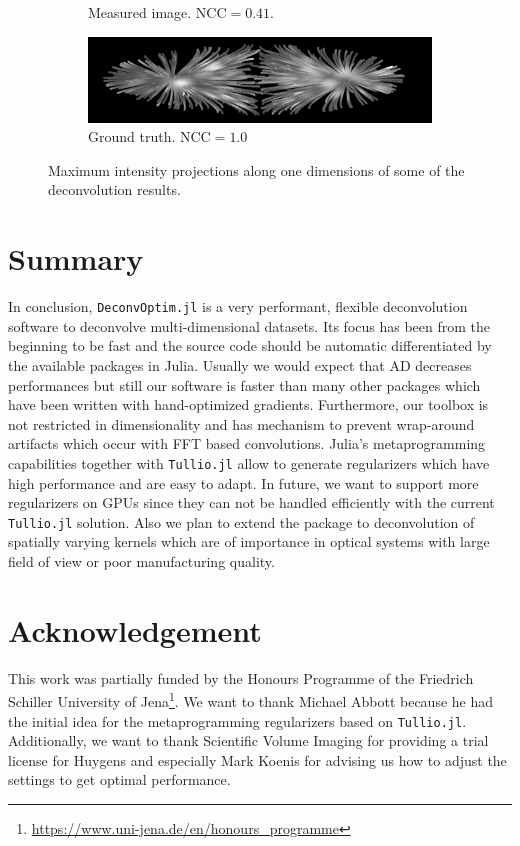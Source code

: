 \documentclass{juliacon}
\begin{document}
\begin{figure}[h]
\begin{subfigure}{.3\textwidth}
                \caption{Measured image. $\text{NCC}= 0.41$.}
            \end{subfigure}
            \begin{subfigure}{.3\textwidth}
                \centering
                \includegraphics[width=\textwidth]{figures/MIPs/mip_ground_truth.png}
                \caption{Ground truth. $\text{NCC}= 1.0$}
            \end{subfigure}
            \caption{Maximum intensity projections along one dimensions of some of the deconvolution results.}
            \label{img:results}
        \end{figure} 

\section{Summary}
    In conclusion, \verb|DeconvOptim.jl| is a very performant, flexible deconvolution software to deconvolve multi-dimensional datasets.
    Its focus has been from the beginning to be fast and the source code should be automatic differentiated by the available
    packages in Julia. Usually we would expect that AD decreases performances but still our software is faster than
    many other packages which have been written with hand-optimized gradients.
    Furthermore, our toolbox is not restricted in dimensionality and has mechanism to prevent wrap-around artifacts which
    occur with FFT based convolutions.
    Julia's metaprogramming capabilities together with \verb|Tullio.jl| allow to generate regularizers which have high performance
    and are easy to adapt.
    In future, we want to support more regularizers on GPUs since they can not be handled efficiently with the current \verb|Tullio.jl| solution.
    Also we plan to extend the package to deconvolution of spatially varying kernels which are of importance in optical systems
    with large field of view or poor manufacturing quality.

\section{Acknowledgement}
    This work was partially funded by the Honours Programme of the Friedrich Schiller 
    University of Jena\footnote{\url{https://www.uni-jena.de/en/honours_programme}}.
    We want to thank Michael Abbott because he had the
    initial idea for the metaprogramming regularizers based on \verb|Tullio.jl|. 
    Additionally, we want to thank Scientific Volume Imaging for providing a trial license for Huygens and especially Mark Koenis for advising
    us how to adjust the settings to get optimal performance. 
\newpage

\end{document}
